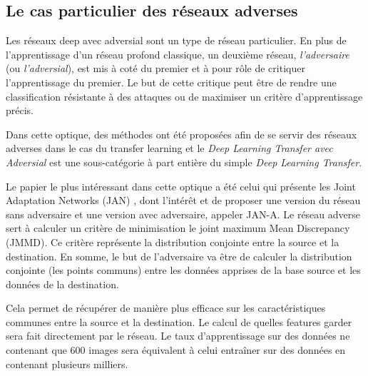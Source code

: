 \subsection*{Le cas particulier des réseaux adverses}
\label{subsec:adversials}
Les réseaux deep avec adversial sont un type de réseau particulier. En plus de l'apprentissage d'un réseau profond classique, un deuxième réseau, \textit{l'adversaire} (ou \textit{l'adversial}), est mis à coté du premier et à pour rôle de critiquer l'apprentissage du premier. Le but de cette critique peut être de rendre une classification résistante à des attaques ou de maximiser un critère d'apprentissage précis.

Dans cette optique, des méthodes ont été proposées afin de se servir des réseaux adverses dans le cas du transfer learning et le \textit{Deep Learning Transfer avec Adversial} est une sous-catégorie à part entière du simple \textit{Deep Learning Transfer}.

Le papier le plus intéressant dans cette optique a été celui qui présente les Joint Adaptation Networks (JAN) \cite{DBLP:journals/corr/Long0J16a}, dont l'intérêt et de proposer une version du réseau sans adversaire et une version avec adversaire, appeler JAN-A. Le réseau adverse sert à calculer un critère de minimisation le joint maximum Mean Discrepancy (JMMD). Ce critère représente la distribution conjointe entre la source et la destination. En somme, le but de l'adversaire va être de calculer la distribution conjointe (les points communs) entre les données apprises de la base source et les données de la destination.

Cela permet de récupérer de manière plus efficace sur les caractéristiques communes entre la source et la destination. Le calcul de quelles features garder sera fait directement par le réseau.
Le taux d'apprentissage sur des données ne contenant que 600 images sera équivalent à celui entraîner sur des données en contenant plusieurs milliers.
